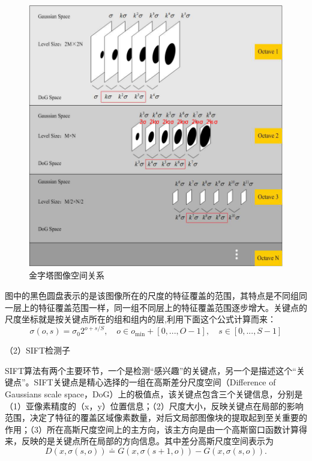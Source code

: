 \begin{figure}
\centering\includegraphics[width=15cm]{imgs/ch2/DoG}
\caption{金字塔图像空间关系}
\label{fig:DoG}
\end{figure}

图中的黑色圆盘表示的是该图像所在的尺度的特征覆盖的范围，其特点是不同组同一层上的特征覆盖范围一样，同一组不同层上的特征覆盖范围逐步增大。关键点的尺度坐标就是按关键点所在的组和组内的层,利用下面这个公式计算而来：
\begin{equation}
  \sigma(o,s) = \sigma_0 2^{o+s/S},
  \quad o \in o_{\min} + [0, ..., O-1],
  \quad s \in [0,...,S-1]
\end{equation}

（2）SIFT检测子

SIFT算法有两个主要环节，一个是检测“感兴趣”的关键点，另一个是描述这个“关键点”。SIFT关键点是精心选择的一组在高斯差分尺度空间（Difference of Gaussians scale space，DoG）上的极值点，该关键点包含三个关键信息，分别是（1）亚像素精度的（x，y）位置信息；（2）尺度大小，反映关键点在局部的影响范围，决定了特征的覆盖区域像素数量，对后文局部图像块的提取起到至关重要的作用；（3）所在高斯尺度空间上的主方向，该主方向是由一个高斯窗口函数计算得来，反映的是关键点所在局部的方向信息。其中差分高斯尺度空间表示为
\begin{equation}
  D(x,\sigma(s,o)) \doteq G(x,\sigma(s+1,o)) - G(x,\sigma(s,o)).
\end{equation}

